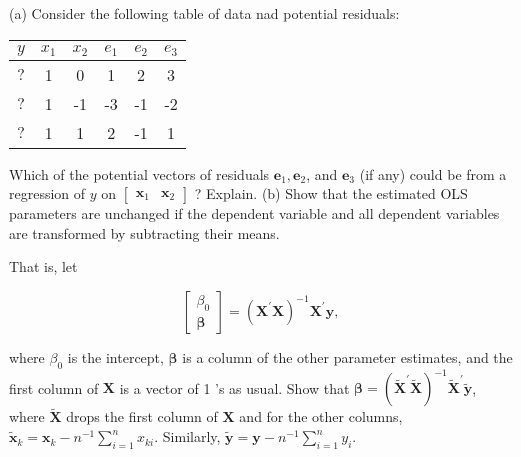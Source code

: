 \documentclass[11pt]{article}
\begin{document}
(a) Consider the following table of data nad potential residuals:\\
\begin{tabular}{cccccc}
$y$ & $x_1$ & $x_2$ & $e_1$ & $e_2$ & $e_3$ \\
\hline$?$ & 1 & 0 & 1 & 2 & 3 \\
$?$ & 1 & -1 & -3 & -1 & -2 \\
$?$ & 1 & 1 & 2 & -1 & 1
\end{tabular}

Which of the potential vectors of residuals $\boldsymbol{e}_1, \boldsymbol{e}_2$, and $\boldsymbol{e}_3$ (if any) could be from a regression of $y$ on $\left[\begin{array}{ll}\boldsymbol{x}_1 & \boldsymbol{x}_2\end{array}\right]$ ? Explain.
(b) Show that the estimated OLS parameters are unchanged if the dependent variable and all dependent variables are transformed by subtracting their means.

That is, let

$$
\left[\begin{array}{c}
\beta_0 \\
\boldsymbol{\beta}
\end{array}\right]=\left(\boldsymbol{X}^{\prime} \boldsymbol{X}\right)^{-1} \boldsymbol{X}^{\prime} \boldsymbol{y},
$$

where $\beta_0$ is the intercept, $\boldsymbol{\beta}$ is a column of the other parameter estimates, and the first column of $\boldsymbol{X}$ is a vector of 1 's as usual. Show that $\boldsymbol{\beta}=\left(\widetilde{\boldsymbol{X}}^{\prime} \widetilde{\boldsymbol{X}}\right)^{-1} \widetilde{\boldsymbol{X}}^{\prime} \widetilde{\boldsymbol{y}}$, where $\widetilde{\boldsymbol{X}}$ drops the first column of $\boldsymbol{X}$ and for the other columns, $\widetilde{\boldsymbol{x}}_k=\boldsymbol{x}_k-n^{-1} \sum_{i=1}^n x_{k i}$. Similarly, $\widetilde{\boldsymbol{y}}=\boldsymbol{y}-n^{-1} \sum_{i=1}^n y_i$.
\end{document}
